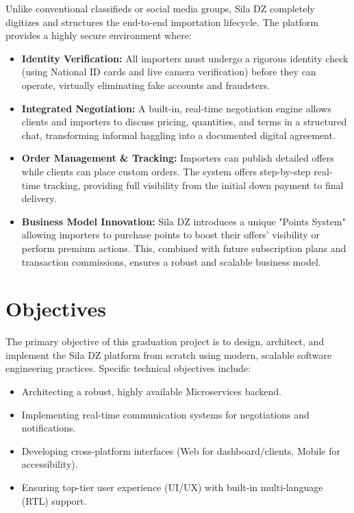 Unlike conventional classifieds or social media groups, Sila DZ completely digitizes and structures the end-to-end importation lifecycle. The platform provides a highly secure environment where:
\begin{itemize}
    \item \textbf{Identity Verification:} All importers must undergo a rigorous identity check (using National ID cards and live camera verification) before they can operate, virtually eliminating fake accounts and fraudsters.
    \item \textbf{Integrated Negotiation:} A built-in, real-time negotiation engine allows clients and importers to discuss pricing, quantities, and terms in a structured chat, transforming informal haggling into a documented digital agreement.
    \item \textbf{Order Management \& Tracking:} Importers can publish detailed offers while clients can place custom orders. The system offers step-by-step real-time tracking, providing full visibility from the initial down payment to final delivery.
    \item \textbf{Business Model Innovation:} Sila DZ introduces a unique "Points System" allowing importers to purchase points to boost their offers' visibility or perform premium actions. This, combined with future subscription plans and transaction commissions, ensures a robust and scalable business model.
\end{itemize}

\section{Objectives}
The primary objective of this graduation project is to design, architect, and implement the Sila DZ platform from scratch using modern, scalable software engineering practices. Specific technical objectives include:
\begin{itemize}
    \item Architecting a robust, highly available Microservices backend.
    \item Implementing real-time communication systems for negotiations and notifications.
    \item Developing cross-platform interfaces (Web for dashboard/clients, Mobile for accessibility).
    \item Ensuring top-tier user experience (UI/UX) with built-in multi-language (RTL) support.
\end{itemize}

